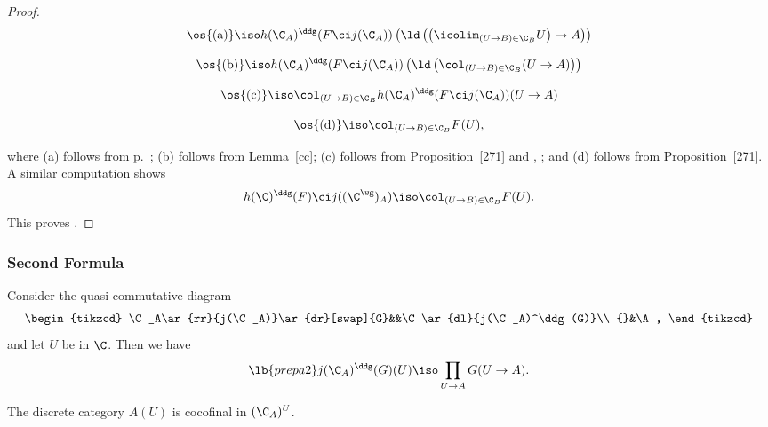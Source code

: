 \documentclass[12pt]{article}
\theoremstyle{remark}
\theoremstyle{definition}
\begin{document}
\begin{proof}
$$\os{(\text a)}\iso h(\C_A)^\ddg(F\ci j(\C_A))\left(\ld\left(\left(\icolim_{(U\to B)\in\C_B}U\right)\to A\right)\right)$$

$$\os{(\text b)}\iso h(\C_A)^\ddg(F\ci j(\C_A))\left(\ld\left(\col_{(U\to B)\in\C_B}(U\to A)\right)\right)$$

$$\os{(\text c)}\iso\col_{(U\to B)\in\C_B}h(\C_A)^\ddg(F\ci j(\C_A))(U\to A)$$

$$\os{(\text d)}\iso\col_{(U\to B)\in\C_B}F(U),$$

\nn where (a) follows from  p.~; (b) follows from Lemma~\ref{cc}; (c) follows from Proposition~\ref{271} and , ; and (d) follows from Proposition~\ref{271}. A similar computation shows 
$$
h(\C)^\ddg(F)\ci j((\C^\wg)_A)\iso\col_{(U\to B)\in\C_B}F(U).
$$ 
This proves .
\end{proof}

%

\subsubsection{Second Formula}

\begin{prop}
Consider the quasi-commutative diagram 
$$
\begin{tikzcd}
\C_A\ar{rr}{j(\C_A)}\ar{dr}[swap]{G}&&\C\ar{dl}{j(\C_A)^\ddg(G)}\\ 
{}&\A,
\end{tikzcd}
$$ 
and let $U$ be in $\C$. Then we have 
\begin{equation}\lb{prepa2}
j(\C_A)^\ddg(G)(U)\iso\prod_{U\to A}G(U\to A).
\end{equation} 
\end{prop}

\begin{lem}
The discrete category $A(U)$ is cocofinal in $(\C_A)^U$.
\end{lem}
\end{document}
